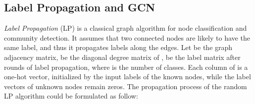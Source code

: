 \documentclass[11pt]{article}
\begin{document}
\begin{table}
\caption{Categorization of some popular EA methods.}\label{tabel:rw}
\end{table}

\subsection{Label Propagation and GCN}
\emph{Label Propagation} (LP) \cite{Zhu2002LearningFL} is a classical graph algorithm for node classification and community detection.
It assumes that two connected nodes are likely to have the same label, and thus it propagates labels along the edges.
Let  be the graph adjacency matrix,  be the diagonal degree matrix of ,  be the label matrix after  rounds of label propagation, where  is the number of classes.
Each column of  is a one-hot vector, initialized by the input labels of the known nodes, while the label vectors of unknown nodes remain zeros.
The propagation process of the random LP algorithm could be formulated as follow:
\end{document}
